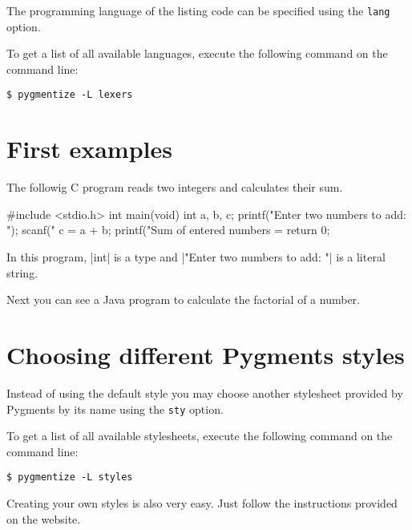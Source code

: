 \documentclass[10pt,a4paper]{article}
\begin{document}
The programming language of the listing code can be specified using the
\verb|lang| option.

To get a list of all available languages, execute the following command
on the command line:
\begin{verbatim}
$ pygmentize -L lexers
\end{verbatim}

\section{First examples}

The followig C program reads two integers and calculates their sum.

\begin{Example}
\begin{pygmented}[lang=c]
#include <stdio.h>
int main(void)
{
   int a, b, c;
   printf("Enter two numbers to add: ");
   scanf("%
   c = a + b;
   printf("Sum of entered numbers = %
   return 0;
}
\end{pygmented}
\end{Example}

\begin{Example}
  In this program, \pyginline[lang=c]|int| is a type and
  \pyginline[lang=c]|"Enter two numbers to add: "| is a literal string.
\end{Example}

Next you can see a Java program to calculate the factorial of a number.

\begin{Example}
\end{Example}

\section{Choosing different Pygments styles}

Instead of using the default style you may choose another stylesheet
provided by Pygments by its name using the \verb|sty| option.

To get a list of all available stylesheets, execute the following
command on the command line:
\begin{verbatim}
$ pygmentize -L styles
\end{verbatim}

Creating your own styles is also very easy. Just follow the instructions
provided on the website.
\end{document}
